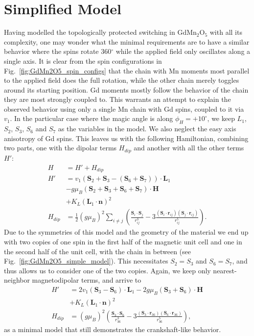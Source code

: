 \section{Simplified Model}
Having modelled the topologically protected switching in  GdMn$_2$O$_5$ with all its complexity, one may wonder what the minimal requirements are to have a similar behavior where the spins rotate 360$^\circ$ while the applied field only oscillates along a single axis.
It is clear from the spin configurations in Fig.~\ref{fig:GdMn2O5_spin_configs} that the chain with Mn moments most parallel to the applied field does the full rotation, while the other chain merely toggles around its starting position. Gd moments mostly follow the behavior of the chain they are most strongly coupled to. This warrants an attempt to explain the observed behavior using only a single Mn chain with Gd spins, coupled to it via $v_1$. 
In the particular case where the magic angle is along $\phi_H = +10^\circ$, we keep $L_1$, $S_2$, $S_3$, $
S_6$ and $S_7$ as the variables in the model. We also neglect the easy axis anisotropy of Gd spins.
This leaves us with the following Hamiltonian, combining two parts, one with the dipolar terms $H_{dip}$ and another with all the other terms $H'$:
\begin{align}
	H &= H' + H_{dip} \\
	H' &= v_1(\bm{S}_2 + \bm{S}_3 - (\bm{S}_6 + \bm{S}_7))\cdot\bm{L}_1 \nonumber\\
	&- g \mu_B (\bm{S}_2 + \bm{S}_3 + \bm{S}_6 + \bm{S}_7) \cdot \bm{H} \nonumber\\
	&+ K_L (\bm{L}_1 \cdot \bm{n})^2 \nonumber\\
	H_{dip} &= \frac{1}{2}(g \mu_B)^2\sum_{i\neq j}\left(\frac{\bm{S}_i\cdot \bm{S}_j}{r_{ij}^
3}-3\frac{(\bm{S}_i\cdot \bm{r}_{ij})(\bm{S}_j\cdot \bm{r}_{ij})}{r_{ij}^5}\right)\nonumber.
\end{align}
Due to the symmetries of this model and the geometry of the material we end up with two copies of one spin in the first half of the magnetic unit cell and one in the second half of the unit cell, with the chain in between (see Fig.~\ref{fig:GdMn2O5_simple_model}).
This necessitates $S_2 = S_3$ and $S_6 = S_7$, and thus allows us to consider one of the two copies. Again, we keep only nearest-neighbor magnetodipolar terms, and arrive to
\begin{align}
	H' &= 2v_1(\bm{S}_3 - \bm{S}_6)\cdot\bm{L}_1 - 2g \mu_B (\bm{S}_3 + \bm{S}_6) 
\cdot \bm{H} \\
	&+ K_L (\bm{L}_1 \cdot \bm{n})^2 \nonumber\\
	H_{dip} &= (g \mu_B)^2\left(\frac{\bm{S}_3\cdot \bm{S}_6}{r_{36}^3}-3\frac{(\bm{S}_3\cdot \bm{r}_{36})(\bm{S}_6\cdot \bm{r}_{36})}{r_{36}^5}\right)\nonumber,
\end{align}
as a minimal model that still demonstrates the crankshaft-like behavior.


